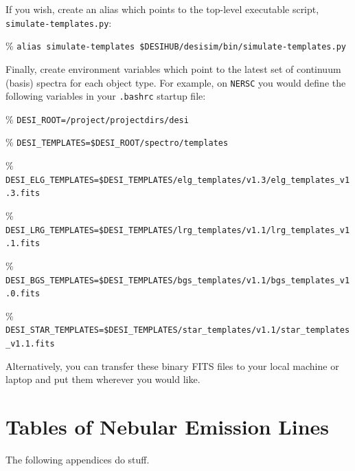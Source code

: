 \documentclass[11pt]{article}
\begin{document}
\noindent If you wish, create an alias which points to the top-level executable
script, {\tt simulate-templates.py}:
\begin{itemize*}
  \item[\%]{{\tt alias simulate-templates \$DESIHUB/desisim/bin/simulate-templates.py}}
\end{itemize*}

\noindent Finally, create environment variables which point to the latest set of
continuum (basis) spectra for each object type.  For example, on {\tt NERSC} you
would define the following variables in your {\tt .bashrc} startup file:
\begin{itemize*}
  \item[\%]{{\tt DESI\_ROOT=/project/projectdirs/desi}}
  \item[\%]{{\tt DESI\_TEMPLATES=\$DESI\_ROOT/spectro/templates}}
  \item[\%]{{\tt DESI\_ELG\_TEMPLATES=\$DESI\_TEMPLATES/elg\_templates/v1.3/elg\_templates\_v1.3.fits}}
  \item[\%]{{\tt DESI\_LRG\_TEMPLATES=\$DESI\_TEMPLATES/lrg\_templates/v1.1/lrg\_templates\_v1.1.fits}}
  \item[\%]{{\tt DESI\_BGS\_TEMPLATES=\$DESI\_TEMPLATES/bgs\_templates/v1.1/bgs\_templates\_v1.0.fits}}
  \item[\%]{{\tt DESI\_STAR\_TEMPLATES=\$DESI\_TEMPLATES/star\_templates/v1.1/star\_templates\_v1.1.fits}}
\end{itemize*}

\noindent Alternatively, you can transfer these binary FITS files to your local
machine or laptop and put them wherever you would like.  

\section{Tables of Nebular Emission Lines}

The following appendices do stuff.
\end{document}
